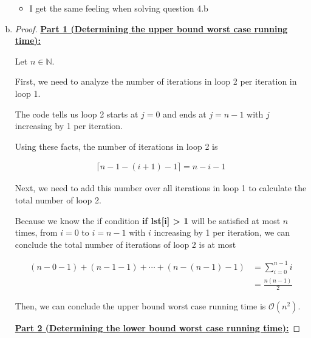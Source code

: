 \documentclass[12pt]{article}
\begin{document}
\begin{enumerate}[a.]
\begin{itemize}
        \item I get the same feeling when solving question 4.b
    \end{itemize}

    \item

    \begin{proof}
        \underline{\textbf{Part 1 (Determining the upper bound worst case running time):}}

        \bigskip

        Let $n \in \mathbb{N}$.

        \bigskip

        First, we need to analyze the number of iterations in loop 2 per iteration in
        loop 1.

        \bigskip

        The code tells us loop 2 starts at $j = 0$ and ends at $j = n -1$ with $j$
        increasing by 1 per iteration.

        \bigskip

        Using these facts, the number of iterations in loop 2 is

        \setcounter{equation}{0}
        \begin{align}
            \lceil n - 1 - (i+1) - 1 \rceil = n - i - 1
        \end{align}

        \bigskip

        Next, we need to add this number over all iterations in loop 1 to calculate
        the total number of loop 2.

        \bigskip

        Because we know the if condition \textbf{if lst[i] > 1} will be satisfied at most
        $n$ times, from $i = 0$ to $i = n - 1$ with $i$ increasing by 1 per iteration,
        we can conclude the total number of iterations of loop 2 is at most

        \begin{align}
            (n-0-1) + (n-1-1) + \cdots + (n - (n-1) - 1) &= \sum\limits_{i=0}^{n-1} i\\
            &= \frac{n(n-1)}{2}
        \end{align}

        \bigskip

        Then, we can conclude the upper bound worst case running time is $\mathcal{O}(n^2)$.

        \bigskip

        \underline{\textbf{Part 2 (Determining the lower bound worst case running time):}}
    \end{proof}

\end{enumerate}
\end{document}
